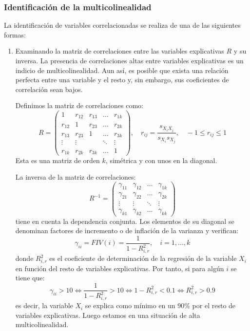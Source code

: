 \documentclass{report}
\theoremstyle{remark}
\theoremstyle{remark}
\theoremstyle{remark}
\theoremstyle{definition}
\theoremstyle{definition}
\theoremstyle{definition}
\begin{document}
\subsubsection*{Identificación de la multicolinealidad}
La identificación de variables correlacionadas se realiza de una de las siguientes formas:
\begin{enumerate}
    \item Examinando la matriz de correlaciones entre las variables explicativas $R$ y su inversa.
          La presencia de correlaciones altas entre variables explicativas es un indicio de multicolinealidad.
          Aun así, es posible que exista una relación perfecta entre una variable y el resto y, sin embargo, sus coeficientes de correlación sean bajos.

          Definimos la matriz de correlaciones como:
          $$R = \begin{pmatrix}
                  1      & r_{12} & r_{13} & \dots  & r_{1k} \\
                  r_{12} & 1      & r_{23} & \dots  & r_{2k} \\
                  r_{13} & r_{23} & 1      & \dots  & r_{3k} \\
                  \vdots & \vdots &        & \ddots & \vdots \\
                  r_{1k} & r_{2k} & r_{3k} & \dots  & 1
              \end{pmatrix}, \quad r_{ij} = \frac{s_{X_iX_j}}{s_{X_i}s_{X_j}}, \quad -1 \leq r_{ij} \leq 1$$
          Esta es una matriz de orden $k$, simétrica y con unos en la diagonal.

          La inversa de la matriz de correlaciones:
          $$R^{-1} = \begin{pmatrix}
                  \gamma_{11} & \gamma_{12} & \dots  & \gamma_{1k} \\
                  \gamma_{21} & \gamma_{22} & \dots  & \gamma_{2k} \\
                  \vdots      & \vdots      & \ddots & \vdots      \\
                  \gamma_{k1} & \gamma_{k2} & \dots  & \gamma_{kk}
              \end{pmatrix}$$
          tiene en cuenta la dependencia conjunta.
          Los elementos de su diagonal se denominan factores de incremento o de inflación de la varianza y verifican:
          $$\gamma_{ii} = FIV(i) = \frac{1}{1-R^2_{i,r}}, \quad i = 1, \dots, k$$
          donde $R^2_{i,r}$ es el coeficiente de determinación de la regresión de la variable $X_i$ en función del resto de variables explicativas.
          Por tanto, si para algún $i$ se tiene que:
          $$\gamma_{ii} > 10 \Leftrightarrow \frac{1}{1-R^2_{i,r}} > 10 \Leftrightarrow 1 - R^2_{i,r} < 0.1 \Leftrightarrow R^2_{i,r} > 0.9$$
          es decir, la variable $X_i$ se explica como mínimo en un 90\% por el resto de variables explicativas.
          Luego estamos en una situación de alta multicolinealidad.


\end{enumerate}
\end{document}
